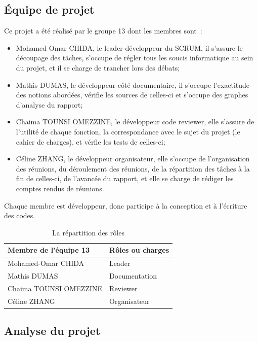\documentclass[12pt]{article}
\begin{document}
\subsection{Équipe de projet}
Ce projet a été réalisé par le groupe 13 dont les membres sont~:
\begin{itemize}
    \item Mohamed Omar CHIDA, le leader développeur du SCRUM, il s'assure le découpage des tâches, s'occupe de régler tous les soucis informatique au sein du projet, et il se charge de trancher lors des débats;
    \item Mathis DUMAS, le développeur côté documentaire, il s'occupe l'exactitude des notions abordées, vérifie les sources de celles-ci et s'occupe des graphes d'analyse du rapport;
    \item Chaima TOUNSI OMEZZINE, le développeur code reviewer, elle s'assure de l'utilité de chaque fonction, la correspondance avec le sujet du projet (le cahier de charges), et vérfie les tests de celles-ci;
    \item Céline ZHANG, le développeur organisateur, elle s'occupe de l'organisation des réunions, du déroulement des réunions, de la répartition des tâches à la fin de celles-ci, de l'avancée du rapport, et elle se charge de rédiger les comptes rendus de réunions.
\end{itemize}
Chaque membre est développeur, donc participe à la conception et à l'écriture des codes.%
\begin{table}[!h]
\begin{center}
    \begin{tabular}{|l|l|}
    \hline
        Membre de l'équipe 13 & Rôles ou charges \\
    \hline
    \hline
        Mohamed-Omar CHIDA & Leader \\
    \hline
        Mathis DUMAS & Documentation \\
    \hline
        Chaima TOUNSI OMEZZINE & Reviewer \\
    \hline
        Céline ZHANG & Organisateur \\
    \hline
    \end{tabular}
\end{center}
\caption{La répartition des rôles}
\label{tab:roles}
\end{table}

\subsection{Analyse du projet}
\end{document}
